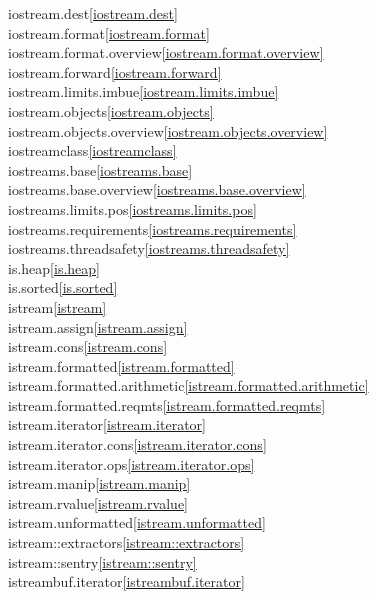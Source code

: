 \begin{multicols}{2}
iostream.dest\quad\ref{iostream.dest}\\
iostream.format\quad\ref{iostream.format}\\
iostream.format.overview\quad\ref{iostream.format.overview}\\
iostream.forward\quad\ref{iostream.forward}\\
iostream.limits.imbue\quad\ref{iostream.limits.imbue}\\
iostream.objects\quad\ref{iostream.objects}\\
iostream.objects.overview\quad\ref{iostream.objects.overview}\\
iostreamclass\quad\ref{iostreamclass}\\
iostreams.base\quad\ref{iostreams.base}\\
iostreams.base.overview\quad\ref{iostreams.base.overview}\\
iostreams.limits.pos\quad\ref{iostreams.limits.pos}\\
iostreams.requirements\quad\ref{iostreams.requirements}\\
iostreams.threadsafety\quad\ref{iostreams.threadsafety}\\
is.heap\quad\ref{is.heap}\\
is.sorted\quad\ref{is.sorted}\\
istream\quad\ref{istream}\\
istream.assign\quad\ref{istream.assign}\\
istream.cons\quad\ref{istream.cons}\\
istream.formatted\quad\ref{istream.formatted}\\
istream.formatted.arithmetic\quad\ref{istream.formatted.arithmetic}\\
istream.formatted.reqmts\quad\ref{istream.formatted.reqmts}\\
istream.iterator\quad\ref{istream.iterator}\\
istream.iterator.cons\quad\ref{istream.iterator.cons}\\
istream.iterator.ops\quad\ref{istream.iterator.ops}\\
istream.manip\quad\ref{istream.manip}\\
istream.rvalue\quad\ref{istream.rvalue}\\
istream.unformatted\quad\ref{istream.unformatted}\\
istream::extractors\quad\ref{istream::extractors}\\
istream::sentry\quad\ref{istream::sentry}\\
istreambuf.iterator\quad\ref{istreambuf.iterator}\\

\end{multicols}
